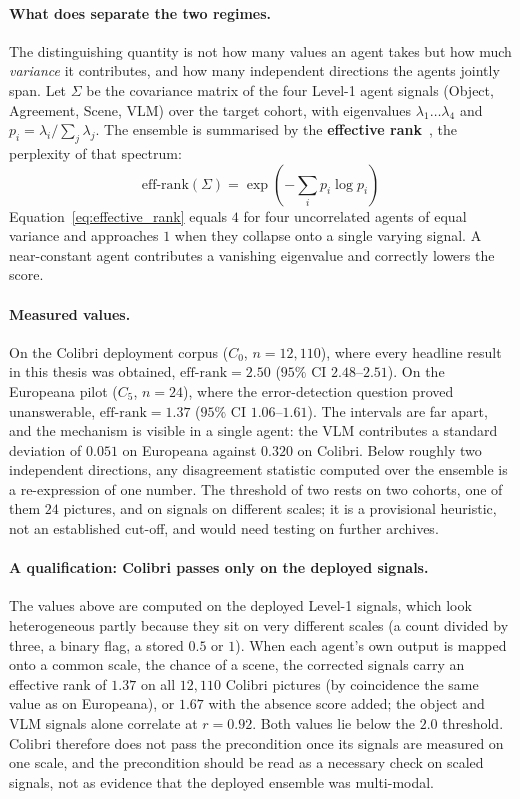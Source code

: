 \documentclass[12pt,a4paper]{report}
\begin{document}
\paragraph{What does separate the two regimes.} The distinguishing quantity is not how many values an agent takes but how much \emph{variance} it contributes, and how many independent directions the agents jointly span. Let $\Sigma$ be the covariance matrix of the four Level-1 agent signals (Object, Agreement, Scene, VLM) over the target cohort, with eigenvalues $\lambda_1 \dots \lambda_4$ and $p_i = \lambda_i / \sum_j \lambda_j$. The ensemble is summarised by the \textbf{effective rank}~\cite{roy2007effective}, the perplexity of that spectrum:
\begin{equation}
    \text{eff-rank}(\Sigma) = \exp\left(-\sum_{i} p_i \log p_i\right)
    \label{eq:effective_rank}
\end{equation}
Equation~\ref{eq:effective_rank} equals $4$ for four uncorrelated agents of equal variance and approaches $1$ when they collapse onto a single varying signal. A near-constant agent contributes a vanishing eigenvalue and correctly lowers the score.

\paragraph{Measured values.} On the Colibri deployment corpus ($C_0$, $n=12{,}110$), where every headline result in this thesis was obtained, $\text{eff-rank}=2.50$ ($95\%$ CI $2.48$--$2.51$). On the Europeana pilot ($C_5$, $n=24$), where the error-detection question proved unanswerable, $\text{eff-rank}=1.37$ ($95\%$ CI $1.06$--$1.61$). The intervals are far apart, and the mechanism is visible in a single agent: the VLM contributes a standard deviation of $0.051$ on Europeana against $0.320$ on Colibri. Below roughly two independent directions, any disagreement statistic computed over the ensemble is a re-expression of one number. The threshold of two rests on two cohorts, one of them $24$ pictures, and on signals on different scales; it is a provisional heuristic, not an established cut-off, and would need testing on further archives.

\paragraph{A qualification: Colibri passes only on the deployed signals.} The values above are computed on the deployed Level-1 signals, which look heterogeneous partly because they sit on very different scales (a count divided by three, a binary flag, a stored $0.5$ or $1$). When each agent's own output is mapped onto a common scale, the chance of a scene, the corrected signals carry an effective rank of $1.37$ on all $12{,}110$ Colibri pictures (by coincidence the same value as on Europeana), or $1.67$ with the absence score added; the object and VLM signals alone correlate at $r=0.92$. Both values lie below the $2.0$ threshold. Colibri therefore does not pass the precondition once its signals are measured on one scale, and the precondition should be read as a necessary check on scaled signals, not as evidence that the deployed ensemble was multi-modal.
\end{document}

